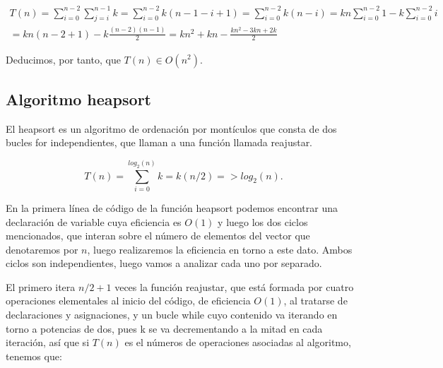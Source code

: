 \documentclass{homework}
\begin{document}
    \begin{equation*}
        \begin{split}
            T(n) = \sum_{i=0}^{n-2} \sum_{j=i}^{n-1} k = \sum_{i=0}^{n-2} k(n-1-i+1) = \sum_{i=0}^{n-2} k(n-i) = kn \sum_{i=0}^{n-2} 1  - k \sum_{i=0}^{n-2} i \\
            = kn(n-2+1) - k \frac{(n-2)(n-1)}{2} = kn^2 + kn - \frac{kn^2 - 3kn + 2k}{2}
        \end{split}
    \end{equation*}
    
    Deducimos, por tanto, que $T(n) \in O(n^2)$. 
    
    \subsection{Algoritmo heapsort}
    
     

    El heapsort es un algoritmo de ordenación por montículos que consta de dos bucles for independientes, que llaman a una función llamada reajustar.
    
     



    \begin{equation*}
        T(n) = \sum_{i=0}^{log_2(n)} k = k(n/2) => log_2(n).
    \end{equation*}

    En la primera línea de código de la función heapsort podemos encontrar una declaración de variable cuya eficiencia es $O(1)$ y luego los dos ciclos 
    mencionados, que interan sobre el número de elementos del vector que denotaremos por $n$, luego realizaremos la eficiencia en torno a este dato. Ambos ciclos son 
    independientes, luego vamos a analizar cada uno por separado.
    
    El primero itera $n/2 + 1$ veces la función reajustar, que está formada por cuatro operaciones elementales al inicio del código, de eficiencia $O(1)$, al tratarse 
    de declaraciones y asignaciones, y un bucle while cuyo contenido va iterando en torno a potencias de dos, pues k se va decrementando a la mitad en cada iteración, así 
    que si $T(n)$ es el números de operaciones asociadas al algoritmo, tenemos que:
\end{document}
